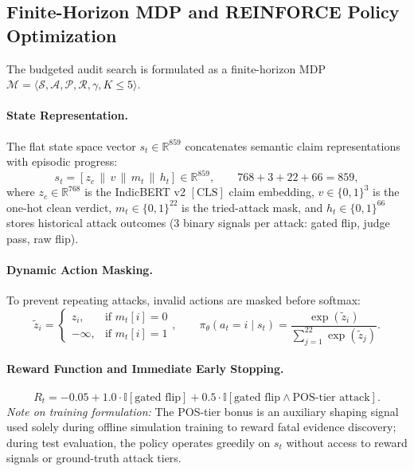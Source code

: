 \subsection{Finite-Horizon MDP and REINFORCE Policy Optimization}

The budgeted audit search is formulated as a finite-horizon MDP $\mathcal{M} = \langle \mathcal{S}, \mathcal{A}, \mathcal{P}, \mathcal{R}, \gamma, K \le 5 \rangle$.

\paragraph{State Representation.} The flat state space vector $s_t \in \mathbb{R}^{859}$ concatenates semantic claim representations with episodic progress:
\begin{equation}
s_t = \left[ z_c \,\|\, v \,\|\, m_t \,\|\, h_t \right] \in \mathbb{R}^{859}, \qquad 768 + 3 + 22 + 66 = 859,
\end{equation}
where $z_c \in \mathbb{R}^{768}$ is the IndicBERT v2 $[\text{CLS}]$ claim embedding, $v \in \{0, 1\}^3$ is the one-hot clean verdict, $m_t \in \{0, 1\}^{22}$ is the tried-attack mask, and $h_t \in \{0, 1\}^{66}$ stores historical attack outcomes (3 binary signals per attack: gated flip, judge pass, raw flip).

\paragraph{Dynamic Action Masking.} To prevent repeating attacks, invalid actions are masked before softmax:
\begin{equation}
\tilde{z}_i = \begin{cases} z_i, & \text{if } m_t[i] = 0 \\ -\infty, & \text{if } m_t[i] = 1 \end{cases}, \qquad \pi_\theta(a_t = i \mid s_t) = \frac{\exp(\tilde{z}_i)}{\sum_{j=1}^{22} \exp(\tilde{z}_j)}.
\end{equation}

\paragraph{Reward Function and Immediate Early Stopping.}
\begin{equation}
R_t = -0.05 + 1.0 \cdot \mathbb{I}[\text{gated flip}] + 0.5 \cdot \mathbb{I}[\text{gated flip} \land \text{POS-tier attack}].
\end{equation}
\textit{Note on training formulation:} The POS-tier bonus is an auxiliary shaping signal used solely during offline simulation training to reward fatal evidence discovery; during test evaluation, the policy operates greedily on $s_t$ without access to reward signals or ground-truth attack tiers.

